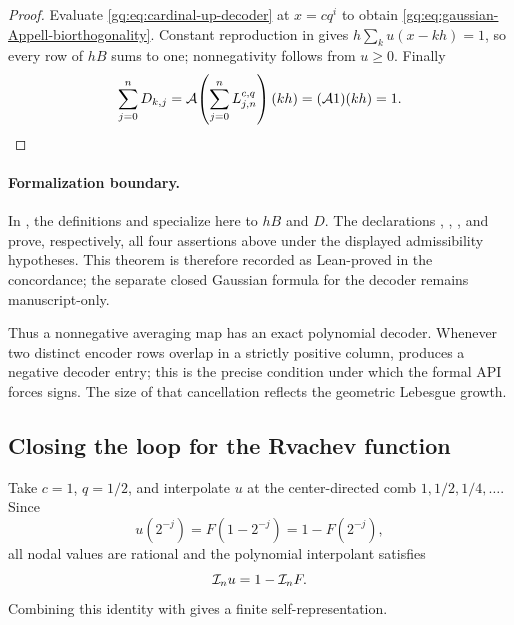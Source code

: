 \begin{proof}
Evaluate \eqref{gq:eq:cardinal-up-decoder} at $x=cq^i$ to obtain
\eqref{gq:eq:gaussian-Appell-biorthogonality}.  Constant reproduction in
 gives
$h\sum_ku(x-kh)=1$, so every row of $hB$ sums to one; nonnegativity follows
from $u\ge0$.  Finally
\[
 \sum_{j=0}^{n}D_{k,j}
 =\mathcal A\!\left(\sum_{j=0}^{n}L_{j,n}^{c,q}\right)(kh)
 =(\mathcal A1)(kh)=1.
\]
\end{proof}

\paragraph{Formalization boundary.}
In , the definitions
 and
 specialize here to $hB$ and $D$.
The declarations ,
,
, and
 prove, respectively,
all four assertions above under the displayed admissibility hypotheses.  This
theorem is therefore recorded as Lean-proved in the concordance; the separate
closed Gaussian formula for the decoder remains manuscript-only.

Thus a nonnegative averaging map has an exact polynomial decoder.  Whenever
two distinct encoder rows overlap in a strictly positive column,
 produces
a negative decoder entry; this is the precise condition under which the
formal API forces signs.  The size of that cancellation reflects the geometric
Lebesgue growth.

\subsection{Closing the loop for the Rvachev function}

Take $c=1$, $q=1/2$, and interpolate $u$ at the center-directed comb
$1,1/2,1/4,\ldots$.  Since
\begin{equation}
 u(2^{-j})=F(1-2^{-j})=1-F(2^{-j}),
 \label{gq:eq:up-center-comb-values}
\end{equation}
all nodal values are rational and the polynomial interpolant satisfies
\begin{equation}
 \mathcal I_nu=1-\mathcal I_nF.
 \label{gq:eq:up-fabius-interpolant-relation}
\end{equation}
Combining this identity with
 gives a finite self-representation.

